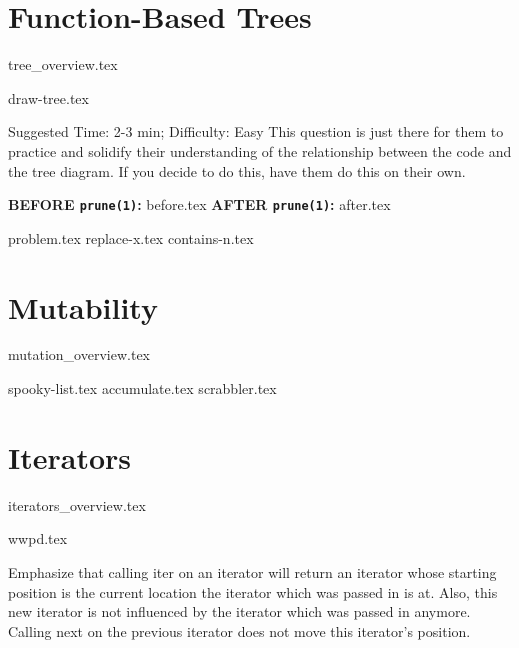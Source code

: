 \documentclass{exam}
\begin{document}
\section{Function-Based Trees}
{tree_overview.tex}
\begin{questions}
    {draw-tree.tex}
    \begin{questionmeta}
        Suggested Time: 2-3 min; Difficulty: Easy
        This question is just there for them to practice and solidify their understanding of the relationship between the code and the tree diagram. 
        If you decide to do this, have them do this on their own.
    \end{questionmeta}
    \newpage
    \begin{blocksection} 
        \textbf{BEFORE \lstinline{prune(1)}:}
        {before.tex}
        \hspace{0.5in}
        \textbf{AFTER \lstinline{prune(1)}:}
        {after.tex}
    \end{blocksection}
    {problem.tex}
    {replace-x.tex} 
    {contains-n.tex}
\end{questions}

\newpage
    
\section{Mutability}
{mutation_overview.tex}
\begin{questions}
    {spooky-list.tex}
    {accumulate.tex}
    \newpage
    {scrabbler.tex}
\end{questions}

\section{Iterators}
{iterators_overview.tex}
\begin{questions}
    {wwpd.tex}
    \begin{questionmeta}
        Emphasize that calling iter on an iterator will return an iterator whose starting position is the current location the iterator which was passed in is at. Also, this new iterator is not influenced by the iterator which was passed in anymore. Calling next on the previous iterator does not move this iterator's position.
    \end{questionmeta}
\end{questions}
\end{document}
